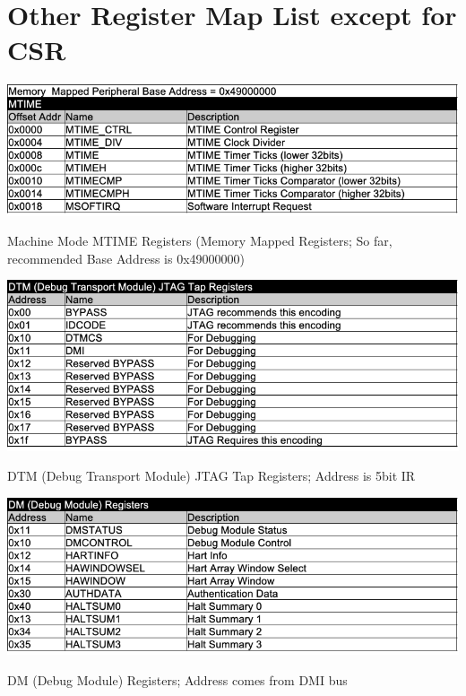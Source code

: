 \section{Other Register Map List except for CSR}

\begin{table}[H]
    \includegraphics[width=1.00\columnwidth]{./Table/REG_MTIME.png}
    \caption{Machine Mode MTIME Registers (Memory Mapped Registers; So far, recommended Base Address is 0x49000000)}
    \label{tb:REG_MTIME}
\end{table}

\begin{table}[H]
    \includegraphics[width=1.00\columnwidth]{./Table/REG_DTM.png}
    \caption{DTM (Debug Transport Module) JTAG Tap Registers; Address is 5bit IR}
    \label{tb:REG_DTM}
\end{table}

\begin{table}[H]
    \includegraphics[width=1.00\columnwidth]{./Table/REG_DM.png}
    \caption{DM (Debug Module) Registers; Address comes from DMI bus}
    \label{tb:REG_DM}
\end{table}

